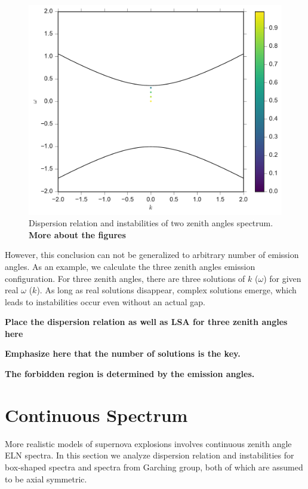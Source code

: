 \documentclass[%
preprint,
 amsmath,amssymb,
 aps,
 prd
]{revtex4-1}
\begin{document}
\begin{figure}[!htb]
  \includegraphics[width=\linewidth]{assets/spectDBWC1DRDBMZAmPlt.pdf}
\endminipage
\caption{Dispersion relation and instabilities of two zenith angles spectrum. {\color{red}\bf More about the figures}  }\label{fig-db-wc1}
\end{figure}


However, this conclusion can not be generalized to arbitrary number of emission angles. As an example, we calculate the three zenith angles emission configuration. For three zenith angles, there are three solutions of $k$ ($\omega$) for given real $\omega$ ($k$). As long as real solutions disappear, complex solutions emerge, which leads to instabilities occur even without an actual gap.



{\color{red}\bf Place the dispersion relation as well as LSA for three zenith angles here}


{\color{red}\bf Emphasize here that the number of solutions is the key.}

{\color{red}\bf The forbidden region is determined by the emission angles.}


\section{\label{sec-continuous-spectrum}Continuous Spectrum}

More realistic models of supernova explosions involves continuous zenith angle ELN spectra. In this section we analyze dispersion relation and instabilities for box-shaped spectra and spectra from Garching group, both of which are assumed to be axial symmetric.
\end{document}
